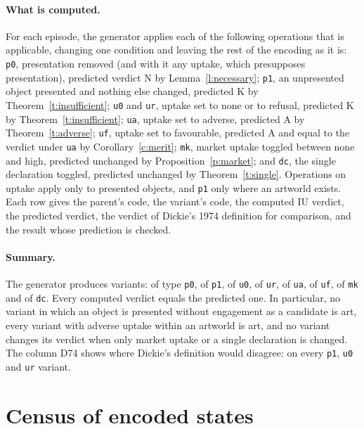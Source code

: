 \documentclass{situationist-preprint}
\begin{document}
\paragraph{What is computed.} For each episode, the generator applies each of the following operations that is applicable, changing one condition and leaving the rest of the encoding as it is: \texttt{p0}, presentation removed (and with it any uptake, which presupposes presentation), predicted verdict N by Lemma~\ref{l:necessary}; \texttt{p1}, an unpresented object presented and nothing else changed, predicted K by Theorem~\ref{t:insufficient}; \texttt{u0} and \texttt{ur}, uptake set to none or to refusal, predicted K by Theorem~\ref{t:insufficient}; \texttt{ua}, uptake set to adverse, predicted A by Theorem~\ref{t:adverse}; \texttt{uf}, uptake set to favourable, predicted A and equal to the verdict under \texttt{ua} by Corollary~\ref{c:merit}; \texttt{mk}, market uptake toggled between none and high, predicted unchanged by Proposition~\ref{p:market}; and \texttt{dc}, the single declaration toggled, predicted unchanged by Theorem~\ref{t:single}. Operations on uptake apply only to presented objects, and \texttt{p1} only where an artworld exists. Each row gives the parent's code, the variant's code, the computed IU verdict, the predicted verdict, the verdict of Dickie's 1974 definition for comparison, and the result whose prediction is checked.

\paragraph{Summary.} The generator produces \stnvariants{} variants: \stoppzero{} of type \texttt{p0}, \stoppone{} of \texttt{p1}, \stopuzero{} of \texttt{u0}, \stopur{} of \texttt{ur}, \stopua{} of \texttt{ua}, \stopuf{} of \texttt{uf}, \stopmk{} of \texttt{mk} and \stopdc{} of \texttt{dc}. Every computed verdict equals the predicted one. In particular, no variant in which an object is presented without engagement as a candidate is art, every variant with adverse uptake within an artworld is art, and no variant changes its verdict when only market uptake or a single declaration is changed. The column D74 shows where Dickie's definition would disagree: on every \texttt{p1}, \texttt{u0} and \texttt{ur} variant.



\section{Census of encoded states}\label{app:census}
\end{document}
